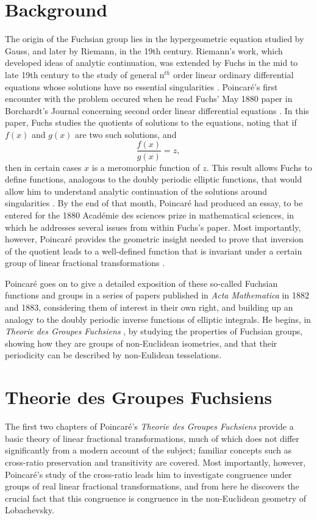 \documentclass[12pt]{article}
\begin{document}
\section{Background}
The origin of the Fuchsian group lies in the hypergeometric equation studied by Gauss, and later by Riemann, in the 19th century. Riemann's work, which developed ideas of analytic continuation, was extended by Fuchs in the mid to late 19th century to the study of general n$^{th}$ order linear ordinary differential equations whose solutions have no essential singularities \cite{JG}. Poincar\'{e}'s first encounter with the problem occured when he read Fuchs' May 1880 paper in Borchardt's Journal \cite{LF} concerning second order linear differential equations \cite{HP2}. In this paper, Fuchs studies the quotients of solutions to the equations, noting that if $f(x)$ and $g(x)$ are two such solutions, and
\[
\frac{f(x)}{g(x)}=z,
\]
then in certain cases $x$ is a meromorphic function of $z$. This result allows Fuchs to define functions, analogous to the doubly periodic elliptic functions, that would allow him to understand analytic continuation of the solutions around singularities \cite{JG}. By the end of that month, Poincar\'{e} had produced an essay, to be entered for the 1880 Acad\'emie des sciences prize in mathematical sciences, in which he addresses several issues from within Fuchs's paper. Most importantly, however, Poincar\'{e} provides the geometric insight needed to prove that inversion of the quotient leads to a well-defined function that is invariant under a certain group of linear fractional transformations \cite{HP2}.

Poincar\'{e} goes on to give a detailed exposition of these so-called Fuchsian functions and groups in a series of papers published in \emph{Acta Mathematica} in 1882 and 1883, considering them of interest in their own right, and building up an analogy to the doubly periodic inverse functions of elliptic integrals. He begins, in \emph{Theorie des Groupes Fuchsiens} \cite{HP1}, by studying the properties of Fuchsian groups, showing how they are groups of non-Euclidean isometries, and that their periodicity can be described by non-Eulidean tesselations.

\section{Theorie des Groupes Fuchsiens}
The first two chapters of Poincar\'{e}'s \emph{Theorie des Groupes Fuchsiens} provide a basic theory of linear fractional transformations, much of which does not differ significantly from a modern account of the subject; familiar concepts such as cross-ratio preservation and transitivity are covered. Most importantly, however, Poincar\'e's study of the cross-ratio leads him to investigate congruence under groups of real linear fractional transformations, and from here he discovers the crucial fact that this congruence is congruence in the non-Euclidean geometry of Lobachevsky.
\end{document}
